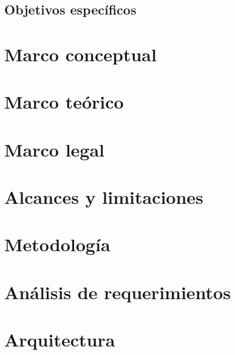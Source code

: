 \documentclass[letter,12pt]{book}
\begin{document}
  \section{Objetivos específicos}
   

  \chapter{Marco conceptual}
  
 
  \chapter{Marco teórico}
  
  
  \chapter{Marco legal}
  
  
  \chapter{Alcances y limitaciones}
  
  
  \chapter{Metodología}
  

%  
  
  \chapter{Análisis de requerimientos}
    
  
  \chapter{Arquitectura}
  \label{chap:arquitectura}
    
  
\end{document}
